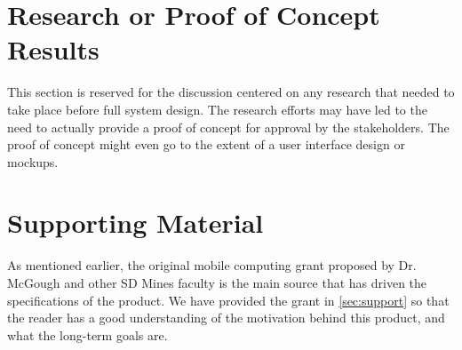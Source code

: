 





\section{Research or Proof of Concept Results}
This section is reserved for the discussion centered on any research that needed
to take place before full system design.  The research efforts may have led to
the need to actually provide a proof of concept for approval by the stakeholders.
 The proof of concept might even go to the extent of a user interface design or
mockups.


\section{Supporting Material}


As mentioned earlier, the original mobile computing grant proposed by Dr.
McGough and other SD Mines faculty is the main source that has driven the
specifications of the product. We have provided the grant in
\autoref{sec:support} so that the reader has a good understanding of the
motivation behind this product, and what the long-term goals are.

